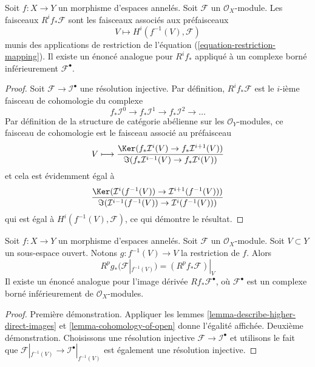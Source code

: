 \begin{lemma}

\label{lemma-describe-higher-direct-images}

Soit $f : X \to Y$ un morphisme d'espaces annelés. Soit $\mathcal{F}$ un $\mathcal{O}_X$-module. Les faisceaux $R^if_*\mathcal{F}$ sont les faisceaux associés aux préfaisceaux
$$
V \longmapsto H^i(f^{-1}(V), \mathcal{F})
$$
munis des applications de restriction de l'équation (\ref{equation-restriction-mapping}). Il existe un énoncé analogue pour $R^if_*$ appliqué à un complexe borné inférieurement $\mathcal{F}^\bullet$.

\end{lemma}

\begin{proof}

Soit $\mathcal{F} \to \mathcal{I}^\bullet$ une résolution injective. Par définition, $R^if_*\mathcal{F}$ est le $i$-ième faisceau de cohomologie du complexe
$$
f_*\mathcal{I}^0 \to f_*\mathcal{I}^1 \to f_*\mathcal{I}^2 \to \ldots
$$
Par définition de la structure de catégorie abélienne sur les $\mathcal{O}_Y$-modules, ce faisceau de cohomologie est le faisceau associé au préfaisceau
$$
V
\longmapsto
\frac{\Ker(f_*\mathcal{I}^i(V) \to f_*\mathcal{I}^{i + 1}(V))}
{\Im(f_*\mathcal{I}^{i - 1}(V) \to f_*\mathcal{I}^i(V))}
$$
et cela est évidemment égal à
$$
\frac{\Ker(\mathcal{I}^i(f^{-1}(V)) \to \mathcal{I}^{i + 1}(f^{-1}(V)))}
{\Im(\mathcal{I}^{i - 1}(f^{-1}(V)) \to \mathcal{I}^i(f^{-1}(V)))}
$$
qui est égal à $H^i(f^{-1}(V), \mathcal{F})$,
ce qui démontre le résultat.

\end{proof}

\begin{lemma}

\label{lemma-localize-higher-direct-images}
Soit $f : X \to Y$ un morphisme d'espaces annelés. Soit $\mathcal{F}$ un $\mathcal{O}_X$-module. Soit $V \subset Y$ un sous-espace ouvert. Notons $g : f^{-1}(V) \to V$ la restriction de $f$. Alors $$
R^pg_*(\mathcal{F}|_{f^{-1}(V)}) = (R^pf_*\mathcal{F})|_V
$$ Il existe un énoncé analogue pour l'image dérivée $Rf_*\mathcal{F}^\bullet$, où $\mathcal{F}^\bullet$ est un complexe borné inférieurement de $\mathcal{O}_X$-modules.
\end{lemma}

\begin{proof}
Première démonstration. Appliquer les lemmes \ref{lemma-describe-higher-direct-images} et \ref{lemma-cohomology-of-open} donne l'égalité affichée. Deuxième démonstration. Choisissons une résolution injective $\mathcal{F} \to \mathcal{I}^\bullet$ et utilisons le fait que $\mathcal{F}|_{f^{-1}(V)} \to \mathcal{I}^\bullet|_{f^{-1}(V)}$ est également une résolution injective.
\end{proof}

